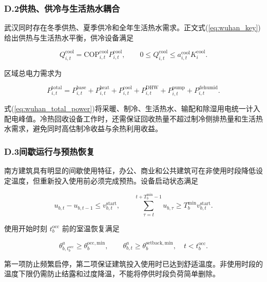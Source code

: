 \subsubsection*{D.2\quad 供热、供冷与生活热水耦合}

武汉同时存在冬季供热、夏季供冷和全年生活热水需求。正文式(\ref{eq:wuhan_key})给出供热与生活热水平衡，供冷设备满足

\begin{equation}
Q_{i,t}^{\mathrm{cool}}=\mathrm{COP}_{i,t}^{\mathrm{cool}}P_{i,t}^{\mathrm{cool}},
\qquad
0\leq Q_{i,t}^{\mathrm{cool}}\leq a_{i,t}^{\mathrm{cool}}K_i^{\mathrm{cool}}.
\label{eq:wuhan_cooling}
\end{equation}

区域总电力需求为

\begin{equation}
P_{i,t}^{\mathrm{total}}
=P_{i,t}^{\mathrm{base}}+P_{i,t}^{\mathrm{heat}}+P_{i,t}^{\mathrm{cool}}
+P_{i,t}^{\mathrm{DHW}}+P_{i,t}^{\mathrm{pump}}+P_{i,t}^{\mathrm{dehumid}}.
\label{eq:wuhan_total_power}
\end{equation}

式(\ref{eq:wuhan_total_power})将采暖、制冷、生活热水、输配和除湿用电统一计入配电峰值。冷热回收设备工作时，还需保证回收热量不超过制冷侧排热量和生活热水需求，避免同时高估制冷收益与余热利用收益。

\subsubsection*{D.3\quad 间歇运行与预热恢复}

南方建筑具有明显的间歇使用特征，办公、商业和公共建筑可在非使用时段降低设定温度，但重新投入使用前必须完成预热。设备启动状态满足

\begin{equation}
u_{b,t}-u_{b,t-1}\leq v_{b,t}^{\mathrm{start}},
\qquad
\sum_{\tau=t}^{t+T_b^{\min}-1}u_{b,\tau}
\geq T_b^{\min}v_{b,t}^{\mathrm{start}}.
\label{eq:wuhan_startup}
\end{equation}

使用开始时刻 $t_b^{\mathrm{occ}}$ 前的室温恢复满足

\begin{equation}
\theta_{b,t_b^{\mathrm{occ}}}^{a}\geq\theta_b^{\mathrm{occ,min}},
\qquad
\theta_{b,t}^{a}\geq\theta_b^{\mathrm{setback,min}},
\quad t<t_b^{\mathrm{occ}}.
\label{eq:wuhan_preheat}
\end{equation}

第一项防止频繁启停，第二项保证建筑投入使用时已达到舒适温度。非使用时段的温度下限仍需防止结露和过度降温，不能将停供时段负荷简单删除。


